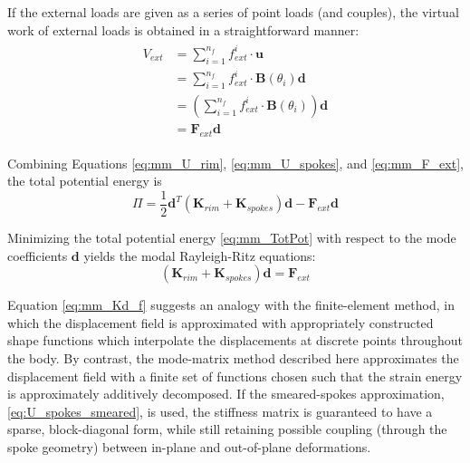 \documentclass[\rootdir/thesis.tex]{subfiles}
\begin{document}
If the external loads are given as a series of point loads (and couples), the virtual work of external loads is obtained in a straightforward manner:
\begin{align}
\label{eq:mm_F_ext}
\begin{split}
V_{ext} &= \sum_{i=1}^{n_f} f_{ext}^i \cdot \mathbf{u} \\
&= \sum_{i=1}^{n_f} f_{ext}^i \cdot \mathbf{B}(\theta_i)\mathbf{d}\\
&= \left(\sum_{i=1}^{n_f} f_{ext}^i \cdot \mathbf{B}(\theta_i) \right) \mathbf{d}\\
&= \mathbf{F}_{ext}\mathbf{d}
\end{split}
\end{align}

Combining Equations \eqref{eq:mm_U_rim}, \eqref{eq:mm_U_spokes}, and \eqref{eq:mm_F_ext}, the total potential energy is
\begin{equation}
\label{eq:mm_TotPot}
\Pi = \frac{1}{2} \mathbf{d}^T \left( \mathbf{K}_{rim} + \mathbf{K}_{spokes} \right) \mathbf{d} - \mathbf{F}_{ext}\mathbf{d}
\end{equation}

Minimizing the total potential energy \eqref{eq:mm_TotPot} with respect to the mode coefficients $\mathbf{d}$ yields the modal Rayleigh-Ritz equations:
\begin{equation}
\label{eq:mm_Kd_f}
\left( \mathbf{K}_{rim} + \mathbf{K}_{spokes} \right) \mathbf{d} = \mathbf{F}_{ext}
\end{equation}

Equation \eqref{eq:mm_Kd_f} suggests an analogy with the finite-element method, in which the displacement field is approximated with appropriately constructed shape functions which interpolate the displacements at discrete points throughout the body. By contrast, the mode-matrix method described here approximates the displacement field with a finite set of functions chosen such that the strain energy is approximately additively decomposed. If the smeared-spokes approximation, \eqref{eq:U_spokes_smeared}, is used, the stiffness matrix is guaranteed to have a sparse, block-diagonal form, while still retaining possible coupling (through the spoke geometry) between in-plane and out-of-plane deformations.
\end{document}
